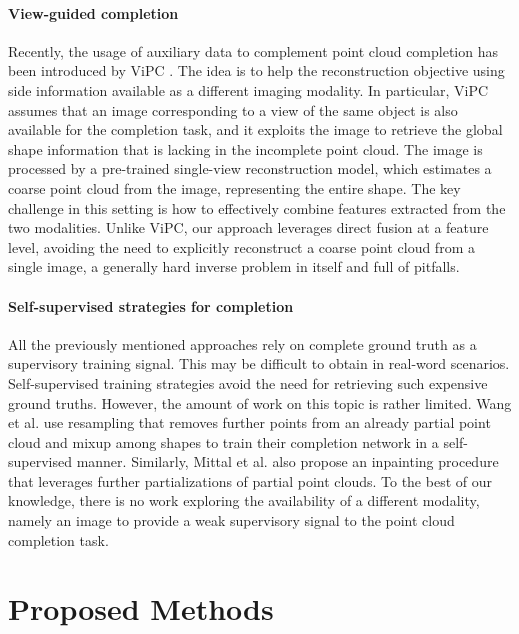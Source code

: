 \documentclass{article}
\begin{document}
\paragraph{View-guided completion} Recently, the usage of auxiliary data to complement point cloud completion has been introduced by ViPC \cite{vipc}. The idea is to help the reconstruction objective using side information available as a different imaging modality. In particular, ViPC assumes that an image corresponding to a view of the same object is also available for the completion task, and it exploits the image to retrieve the global shape information that is lacking in the incomplete point cloud. The image is processed by a pre-trained single-view reconstruction model, which estimates a coarse point cloud from the image, representing the entire shape. The key challenge in this setting is how to effectively combine features extracted from the two modalities. Unlike ViPC, our approach leverages direct fusion at a feature level, avoiding the need to explicitly reconstruct a coarse point cloud from a single image, a generally hard inverse problem in itself and full of pitfalls.


\paragraph{Self-supervised strategies for completion}
All the previously mentioned approaches rely on complete ground truth as a supervisory training signal. This may be difficult to obtain in real-word scenarios. Self-supervised training strategies avoid the need for retrieving such expensive ground truths. However, the amount of work on this topic is rather limited. 
Wang et al. \cite{crn} use resampling that removes further points from an already partial point cloud and mixup among shapes to train their completion network in a self-supervised manner. Similarly, Mittal et al. \cite{selfsup} also propose an inpainting procedure that leverages further partializations of partial point clouds.
To the best of our knowledge, there is no work exploring the availability of a different modality, namely an image to provide a weak supervisory signal to the point cloud completion task. 




\section{Proposed Methods}
\end{document}
